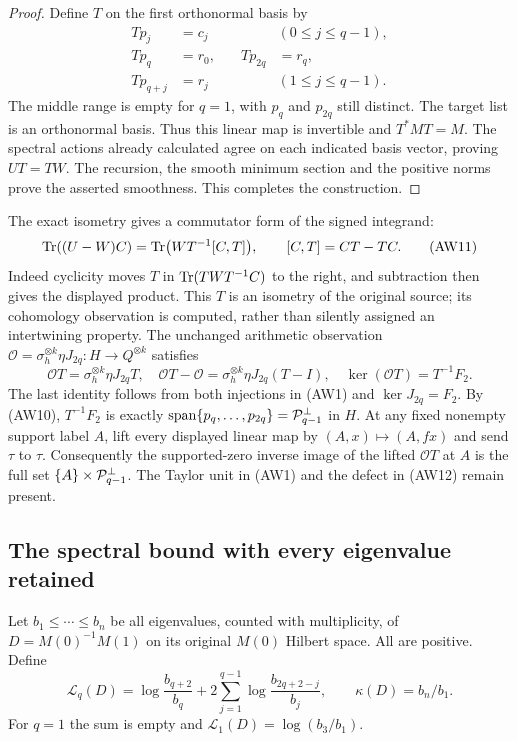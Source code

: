 \begin{proof}
Define $T$ on the first orthonormal basis by
\[
 \begin{aligned}
 Tp_j&=c_j&& (0\le j\le q-1),\\
 Tp_q&=r_0,&\quad Tp_{2q}&=r_q,\\
 Tp_{q+j}&=r_j&& (1\le j\le q-1).
 \end{aligned}
 \tag{AW10}
\]
The middle range is empty for $q=1$, with $p_q$ and $p_{2q}$
still distinct. The target list is an orthonormal basis. Thus this
linear map is invertible and $T^*MT=M$. The spectral actions
already calculated agree on each indicated basis vector, proving
$UT=TW$. The recursion, the smooth minimum section and the positive
norms prove the asserted smoothness. This completes the construction.
\end{proof}

The exact isometry gives a commutator form of the signed integrand:
\[
 \operatorname{Tr}((U-W)C)=\operatorname{Tr}\bigl(WT^{-1}[C,T]\bigr),
 \qquad [C,T]=CT-TC.
 \tag{AW11}
\]
Indeed cyclicity moves $T$ in $\operatorname{Tr}(TWT^{-1}C)$ to the right,
and subtraction then gives the displayed product.
This $T$ is an isometry of the original source; its cohomology
observation is computed, rather than silently assigned an
intertwining property. The unchanged arithmetic observation
$\mathcal O=\sigma_h^{\otimes k}\eta J_{2q}:H\to Q^{\otimes k}$
satisfies
\[
 \mathcal O T=\sigma_h^{\otimes k}\eta J_{2q}T,
 \quad \mathcal O T-\mathcal O
       =\sigma_h^{\otimes k}\eta J_{2q}(T-I),
 \quad \ker(\mathcal O T)=T^{-1}F_2.
 \tag{AW12}
\]
The last identity follows from both injections in (AW1) and
$\ker J_{2q}=F_2$. By (AW10), $T^{-1}F_2$ is exactly
$\operatorname{span}\{p_q,\ldots,p_{2q}\}
=\mathcal P_{q-1}^{\perp}$ in $H$.
At any fixed nonempty support label $A$, lift every displayed
linear map by $(A,x)\mapsto(A,fx)$ and send $\tau$ to $\tau$.
Consequently the supported-zero inverse image of the lifted
$\mathcal O T$ at $A$ is the full set
$\{A\}\times\mathcal P_{q-1}^{\perp}$. The Taylor unit in (AW1)
and the defect in (AW12) remain present.

\subsection{The spectral bound with every eigenvalue retained}

Let $b_1\le\cdots\le b_n$ be all eigenvalues, counted with
multiplicity, of $D=M(0)^{-1}M(1)$ on its original $M(0)$
Hilbert space. All are positive. Define
\[
 \mathcal L_q(D)=\log\frac{b_{q+2}}{b_q}
       +2\sum_{j=1}^{q-1}\log\frac{b_{2q+2-j}}{b_j},
 \qquad \kappa(D)=b_n/b_1.
 \tag{AW13}
\]
For $q=1$ the sum is empty and $\mathcal L_1(D)=\log(b_3/b_1)$.


